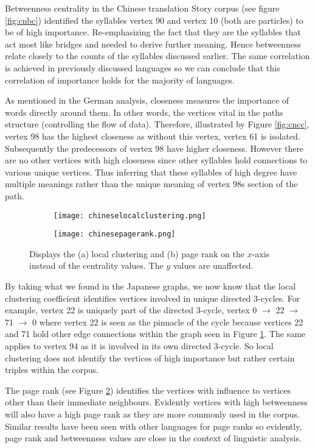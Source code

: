 Betweenness centrality in the Chinese translation Story corpus (see figure \ref{fig:cnbc}) identified the syllables vertex 90 and vertex 10 (both are particles) to be of high importance. Re-emphasizing the fact that they are the syllables that act most like bridges and needed to derive further meaning. Hence betweenness relate closely to the counts of the syllables discussed earlier. The same correlation is achieved in previously discussed languages so we can conclude that this correlation of importance holds for the majority of languages.

As mentioned in the German analysis, closeness measures the importance of words directly around them. In other words, the vertices vital in the paths structure (controlling the flow of data). Therefore, illustrated by Figure \ref{fig:cncc}, vertex 98 has the highest closeness as without this vertex, vertex 61 is isolated. Subsequently the predecessors of vertex 98 have higher closeness. However there are no other vertices with high closeness since other syllables hold connections to various unique vertices. Thus inferring that these syllables of high degree have multiple meanings rather than the unique meaning of vertex 98s section of the path.

\begin{figure}[!htb]
\centering
\begin{subfigure}{.45\textwidth}
	\hspace{-1cm} 
	\texttt{[image: chineselocalclustering.png]}
	\caption{}
	\label{fig:cnlc}
\end{subfigure}
\hfill
\begin{subfigure}{.45\textwidth}
	\hspace{-1cm} 
	\texttt{[image: chinesepagerank.png]}
	\caption{}
	\label{fig:cnpr}
\end{subfigure}
\caption{Displays the (a) local clustering and (b) page rank on the $x$-axis instead of the centrality values. The $y$ values are unaffected.}
\label{fig:cnother}
\end{figure}

By taking what we found in the Japanese graphs, we now know that the local clustering coefficient identifies vertices involved in unique directed 3-cycles. For example, vertex 22 is uniquely part of the directed 3-cycle, vertex 0 $\rightarrow$ 22 $\rightarrow$ 71 $\rightarrow$ 0 where vertex 22 is seen as the pinnacle of the cycle because vertices 22 and 71 hold other edge connections within the graph seen in Figure \ref{fig:cnlc}. The same applies to vertex 94 as it is involved in its own directed 3-cycle. So local clustering does not identify the vertices of high importance but rather certain triples within the corpus.

The page rank (see Figure \ref{fig:cnpr}) identifies the vertices with influence to vertices other than their immediate neighbours. Evidently vertices with high betweenness will also have a high page rank as they are more commonly used in the corpus. Similar results have been seen with other languages for page ranks so evidently, page rank and betweenness values are close in the context of linguistic analysis.

